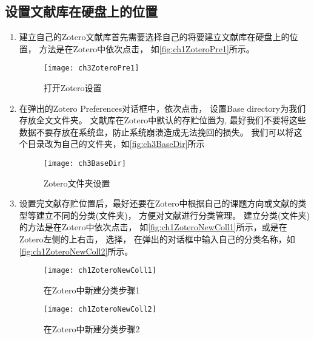 \documentclass[cn,11pt,chinese]{elegantbook}
\begin{document}
		\subsection{设置文献库在硬盘上的位置} 
		\begin{enumerate}
			\item 
			建立自己的Zotero文献库首先需要选择自己的将要建立文献库在硬盘上的位置，
			方法是在Zotero中依次点击，
			如\autoref{fig:ch1ZoteroPre1}所示。
			\begin{figure}[htbp]
				\centering
				\texttt{[image: ch3ZoteroPre1]}
				\caption{打开Zotero设置}
				\label{fig:ch1ZoteroPre1}
			\end{figure}
			
			\item 
			在弹出的Zotero Preferences对话框中，依次点击，
			设置Base directory为我们存放全文文件夹。
			文献库在Zotero中默认的存贮位置为,
			最好我们不要将这些数据不要存放在系统盘，防止系统崩溃造成无法挽回的损失。
			我们可以将这个目录改为自己的文件夹，如\autoref{fig:ch3BaseDir}所示
			\begin{figure}[htbp]
				\centering
				\texttt{[image: ch3BaseDir]}
				\caption{Zotero文件夹设置}
				\label{fig:ch3BaseDir}
			\end{figure}
			\item \label{sec:creat_folder}
			设置完文献存贮位置后，最好还要在Zotero中根据自己的课题方向或文献的类型等建立不同的分类(文件夹)，
			方便对文献进行分类管理。
			建立分类(文件夹)的方法是在Zotero中依次点击，
			如\autoref{fig:ch1ZoteroNewColl1}所示，或是在Zotero左侧的上右击，
			选择，
			在弹出的对话框中输入自己的分类名称，如\autoref{fig:ch1ZoteroNewColl2}所示。
			\begin{figure}
				\centering
				\begin{minipage}[t]{\dimexpr0.5\textwidth-4em}
					\centering
					\texttt{[image: ch1ZoteroNewColl1]}
					\caption{在Zotero中新建分类步骤1}
					\label{fig:ch1ZoteroNewColl1}
				\end{minipage}
			\hspace{1.5cm}
				\begin{minipage}[t]{\dimexpr0.5\textwidth-4em}
					\centering
					\texttt{[image: ch1ZoteroNewColl2]}
					\caption{在Zotero中新建分类步骤2}
					\label{fig:ch1ZoteroNewColl2}
				\end{minipage}

\end{figure}
\end{enumerate}
\end{document}
